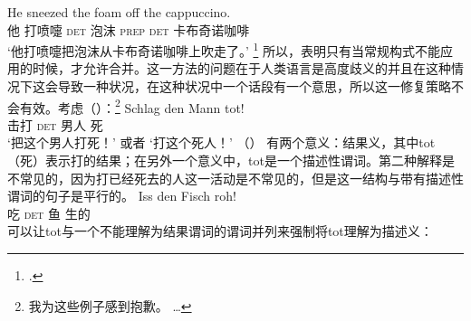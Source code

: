 \ea
\gll He sneezed the foam off the cappuccino.\\
     他 打喷嚏 \textsc{det} 泡沫 \textsc{prep} \textsc{det}  卡布奇诺咖啡\\
\glt `他打喷嚏把泡沫从卡布奇诺咖啡上吹走了。'
\footnote{%
.
}
\z
所以，\citet[--320]{SvT2011a}表明只有当常规构式不能应用的时候，才允许合并。这一方法的问题在于人类语言是高度歧义的并且在这种情况下这会导致一种状况，在这种状况中一个话段有一个意思，所以这一修复策略不会有效。考虑（）：\footnote{%
  我为这些例子感到抱歉。 \ldots
}
\ea
\label{ex-schlag-den-mann-tot}
\gll Schlag den Mann tot!\\
     击打   \textsc{det} 男人  死\\
\glt `把这个男人打死！' 或者 `打这个死人！'
\z
（） 有两个意义：结果义，其中tot（死）表示打的结果；在另外一个意义中，tot是一个描述性谓词。第二种解释是不常见的，因为打已经死去的人这一活动是不常见的，但是这一结构与带有描述性谓词的句子是平行的。
\ea
\gll Iss den Fisch roh!\\
     吃 \textsc{det} 鱼 生的\\
\z
可以让tot与一个不能理解为结果谓词的谓词并列来强制将tot理解为描述义：

